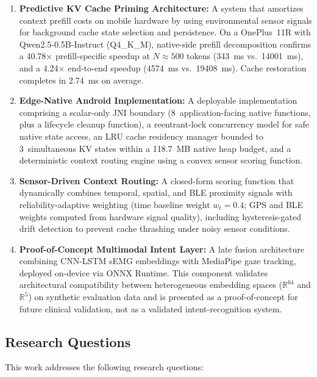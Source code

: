 \documentclass[journal]{IEEEtran}
\begin{document}
\begin{enumerate}
    \item \textbf{Predictive KV Cache Priming Architecture:} A system that amortizes context prefill costs on mobile hardware by using environmental sensor signals for background cache state selection and persistence. On a OnePlus~11R with Qwen2.5-0.5B-Instruct (Q4\_K\_M), native-side prefill decomposition confirms a 40.78$\times$ prefill-specific speedup at $N \approx 500$ tokens (343~ms vs.\ 14001~ms), and a 4.24$\times$ end-to-end speedup (4574~ms vs.\ 19408~ms). Cache restoration completes in 2.74~ms on average.

    \item \textbf{Edge-Native Android Implementation:} A deployable implementation comprising a scalar-only JNI boundary (8~application-facing native functions, plus a lifecycle cleanup function), a reentrant-lock concurrency model for safe native state access, an LRU cache residency manager bounded to 3~simultaneous KV states within a 118.7~MB native heap budget, and a deterministic context routing engine using a convex sensor scoring function.

    \item \textbf{Sensor-Driven Context Routing:} A closed-form scoring function that dynamically combines temporal, spatial, and BLE proximity signals with reliability-adaptive weighting (time baseline weight $w_t = 0.4$; GPS and BLE weights computed from hardware signal quality), including hysteresis-gated drift detection to prevent cache thrashing under noisy sensor conditions.

    \item \textbf{Proof-of-Concept Multimodal Intent Layer:} A late fusion architecture combining CNN-LSTM sEMG embeddings with MediaPipe gaze tracking, deployed on-device via ONNX Runtime. This component validates architectural compatibility between heterogeneous embedding spaces ($\mathbb{R}^{64}$ and $\mathbb{R}^{5}$) on synthetic evaluation data and is presented as a proof-of-concept for future clinical validation, not as a validated intent-recognition system.
\end{enumerate}

\subsection{Research Questions}
\label{sec:rqs}

This work addresses the following research questions:
\end{document}
